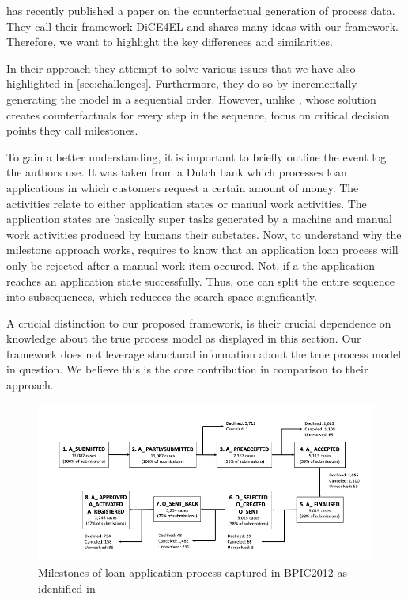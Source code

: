 \documentclass[./../../paper.tex]{subfiles}
\begin{document}
\citeauthor{hsieh_DiCE4ELInterpretingProcess_2021} has recently published a paper on the counterfactual generation of process data. They call their framework DiCE4EL and shares many ideas with our framework. Therefore, we want to highlight the key differences and similarities. 

In their approach they attempt to solve various issues that we have also highlighted in \autoref{sec:challenges}. Furthermore, they do so by incrementally generating the model in a sequential order. However, unlike \citeauthor{oberst_CounterfactualOffPolicyEvaluation_2019}, whose solution creates counterfactuals for every step in the sequence, \citeauthor{hsieh_DiCE4ELInterpretingProcess_2021} focus on critical decision points they call milestones. 

To gain a better understanding, it is important to briefly outline the event log the authors use. It was taken from a Dutch bank which processes loan applications in which customers request a certain amount of money. The activities relate to either application states or manual work activities. The application states are basically super tasks generated by a machine and manual work activities produced by humans their substates. Now, to understand why the milestone approach works, requires to know that an application loan process will only be rejected after a manual work item occured. Not, if a the application reaches an application state successfully. Thus, one can split the entire sequence into subsequences, which reducces the search space significantly. 

A crucial distinction to our proposed framework, is their crucial dependence on knowledge about the true process model as displayed in this section. Our framework does not leverage structural information about the true process model in question. We believe this is the core contribution in comparison to their approach.

\begin{figure}[htbp]
    \centering
    \includegraphics[width=\textwidth]{figures/milestones.png}
    \caption{Milestones of loan application process captured in BPIC2012 as
    identified in \autocite{bautista_ProcessMiningDrivenOptimization_2012}}
    \label{fig:milestones}
\end{figure}
\end{document}
